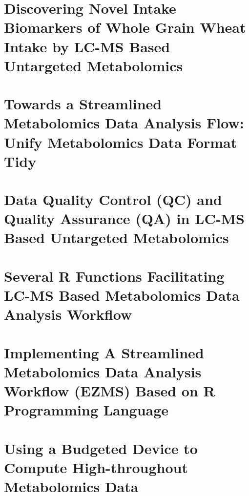 \documentclass[]{report}
\begin{document}
\chapter{Discovering Novel Intake Biomarkers of Whole Grain Wheat Intake by LC-MS Based Untargeted Metabolomics}


\chapter{Towards a Streamlined Metabolomics Data Analysis Flow: Unify Metabolomics Data Format Tidy}


\chapter{Data Quality Control (QC) and Quality Assurance (QA) in LC-MS Based Untargeted Metabolomics}


\chapter{Several R Functions Facilitating LC-MS Based Metabolomics Data Analysis Workflow}


\chapter{Implementing A Streamlined Metabolomics Data Analysis Workflow (EZMS) Based on R Programming Language}

\chapter{Using a Budgeted Device to Compute High-throughout Metabolomics Data}


\end{document}
